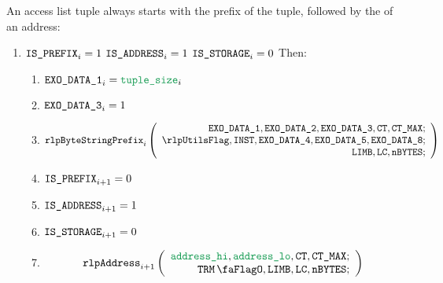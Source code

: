 \begin{center}
\end{center}
An access list tuple always starts with the \rlp{} prefix of the tuple, followed by the \rlp{} of an address:
\begin{enumerate}[resume]
	\item \If $\texttt{IS\_PREFIX} _{i} = 1$ \et $\texttt{IS\_ADDRESS} _{i} = 1$ \et $\texttt{IS\_STORAGE} _{i} = 0$ Then:
		\begin{enumerate}
			\item $\exoDataColumn{1} _{i} = \locAccessListTupleSize _{i}$
			\item $\texttt{EXO\_DATA\_3} _{i} = 1$
			\item
				\[
					\rlpBytestringPrefix _{i}
					\left(
					\begin{array}{r}
						\exoDataColumn{1},
						\exoDataColumn{2},
						\exoDataColumn{3},
						\ct,
						\maxCt; \\
						\rlpUtilsFlag,
						\INST,
						\exoDataColumn{4},
						\exoDataColumn{5},
						\exoDataColumn{8}; \\
						\limb,
						\lc,
						\limbsize; \\
					\end{array}
					\right)
				\]
			\item $\texttt{IS\_PREFIX} _{i + 1} = 0$
			\item $\texttt{IS\_ADDRESS}   _{i + 1} = 1$
			\item $\texttt{IS\_STORAGE}    _{i + 1} = 0$
			\item
				\[
					\rlpAddress _{i + 1}
					\left(
					\begin{array}{r}
						\locAddressHi,
						\locAddressLo,
						\ct,
						\maxCt; \\
						\trmFlag,
						\limb,
						\lc,
						\limbsize; \\
					\end{array}
					\right)
				\]
		\end{enumerate}


\end{enumerate}
